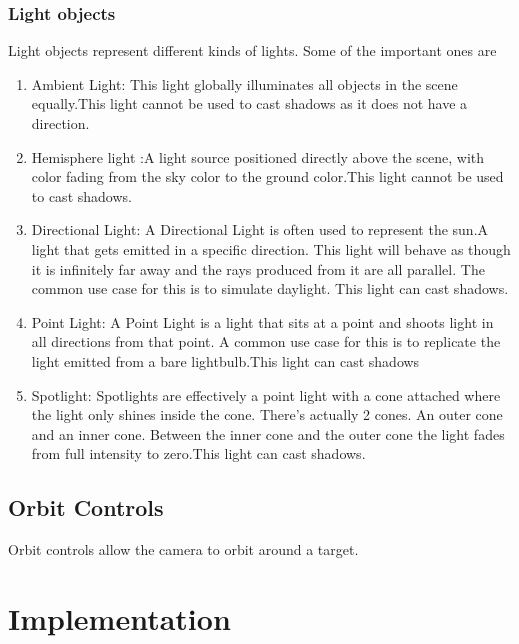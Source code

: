 \documentclass{article}
\begin{document}
    \subsubsection{Light objects}
    Light objects represent different kinds of lights. Some of the important ones are 
    \begin{enumerate}
        \item {Ambient Light}: This light globally illuminates all objects in the scene equally.This light cannot be used to cast shadows as it does not have a direction.
        \item {Hemisphere light} :A light source positioned directly above the scene, with color fading from the sky color to the ground color.This light cannot be used to cast shadows.
        \item {Directional Light}:  A Directional Light is often used to represent the sun.A light that gets emitted in a specific direction. This light will behave as though it is infinitely far away and the rays produced from it are all parallel. The common use case for this is to simulate daylight. This light can cast shadows.
        \item{Point Light}: A Point Light is a light that sits at a point and shoots light in all directions from that point.  A common use case for this is to replicate the light emitted from a bare lightbulb.This light can cast shadows 
        \item{Spotlight}: Spotlights are effectively a point light with a cone attached where the light only shines inside the cone. There's actually 2 cones. An outer cone and an inner cone. Between the inner cone and the outer cone the light fades from full intensity to zero.This light can cast shadows.
    \end{enumerate}
    
    \subsection{Orbit Controls}
    Orbit controls allow the camera to orbit around a target.


\section{Implementation}
\end{document}
